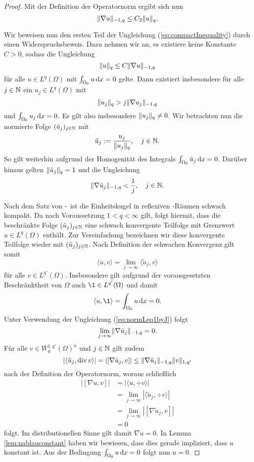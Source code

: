 \begin{proof}
  Mit der Definition der Operatornorm ergibt sich nun
  $$
  \lVert \nabla u \rVert_{-1,q} \leq C_2\lVert u \rVert_q.
  $$

  Wir beweisen nun den ersten Teil der Ungleichung (\ref{eq:compactInequality}) durch einen Widerspruchsbeweis.
  Dazu nehmen wir an, es existiere keine Konstante $C > 0$, sodass die Ungleichung
  $$
  \lVert u \rVert_q \leq C \lVert \nabla u \rVert_{-1,q}
  $$
  für alle $u \in L^q(\Omega)$ mit $\int_{\Omega_0} u \, {\operatorname{d}\!{x}} = 0$ gelte.
  Dann existiert insbesondere für alle $j \in \mathbb{N}$ ein $u_j \in L^q(\Omega)$ mit
  $$
  \lVert u_j \rVert_q > j \lVert \nabla u_j \rVert_{-1,q}
  $$
  und $\int_{\Omega_0} u_j \, {\operatorname{d}\!{x}} = 0$.
  Es gilt also insbesondere $\lVert u_j \rVert_q \neq 0$.
  Wir betrachten nun die normierte Folge $(\tilde u_j)_{j \in \mathbb{N}}$ mit 
  $$
  \tilde u_j := \frac{u_j}{\lVert u_j \rVert_{q}}, \quad j \in \mathbb{N}.
  $$
  So gilt weiterhin aufgrund der Homogenität des Integrals $\int_{\Omega_0} \tilde u_j \, {\operatorname{d}\!{x}} = 0$. 
  Darüber hinaus gelten $\lVert \tilde u_j \rVert_q = 1$ und die Ungleichung 
  \begin{equation}
    \label{eq:normLeq1byJ}
    \lVert \nabla \tilde u_j \rVert_{-1,q} < \frac{1}{j}, \quad j \in \mathbb{N}.
  \end{equation}

  Nach dem Satz von \banach\hyp{}\alaoglu\ ist die Einheitskugel in reflexiven \banach\hyp{}Räumen schwach kompakt.
  Da nach Voraussetzung $1 < q < \infty$ gilt, folgt hiermit, dass die beschränkte Folge $(\tilde u_j)_{j \in \mathbb{N}}$ eine schwach konvergente Teilfolge mit Grenzwert $u \in L^q(\Omega)$ enthält.
  Zur Vereinfachung bezeichnen wir diese konvergente Teilfolge wieder mit $(\tilde u_j)_{j \in \mathbb{N}}$.
  Nach Definition der schwachen Konvergenz gilt somit
  $$
  \langle u, v \rangle = \lim_{j \to \infty} \langle \tilde u_j, v \rangle
  $$
  für alle $v \in L^{q'}(\Omega)$.
  Insbesondere gilt aufgrund der vorausgesetzten Beschränktheit von $\Omega$ auch $\1 \in L^{q'}(\Omega)$ und damit
  $$
  \langle u, \1 \rangle = \int_{\Omega_0} u \d x = 0.
  $$
  Unter Verwendung der Ungleichung (\ref{eq:normLeq1byJ}) folgt
  \begin{equation}
    \label{eq:limNablaU}
    \lim_{j \to \infty} \lVert \nabla \tilde u_j \rVert_{-1,q} = 0. 
  \end{equation}
  Für alle $v \in W_0^{1,q'}(\Omega)^n$ und $j \in \mathbb{N}$ gilt zudem 
  $$ 
  |\langle \tilde u_j, \mathrm{div\,} v \rangle| = |[\nabla \tilde u_j, v]| \leq \lVert \nabla \tilde u_j \rVert_{-1,q} \lVert v \rVert_{1,q'}
  $$
  nach der Definition der Operatornorm, woraus schließlich
  \begin{align*}
    |[\nabla u, v]|
    &= |\langle u, \div v \rangle| \\
    &= \lim_{j \to \infty}|\langle \tilde u_j, \div v \rangle| \\
    &= \lim_{j \to \infty} |[\nabla \tilde u_j, v ]| \\
    &= 0
  \end{align*}
  folgt.
  Im distributionellen Sinne gilt damit $\nabla u = 0$.
  In Lemma \ref{lem:nablauconstant} haben wir bewiesen, dass dies gerade impliziert, dass $u$ konstant ist.
  Aus der Bedingung $\int_{\Omega_0} u \, {\operatorname{d}\!{x}} = 0$ folgt nun $u = 0$. 
  

\end{proof}
